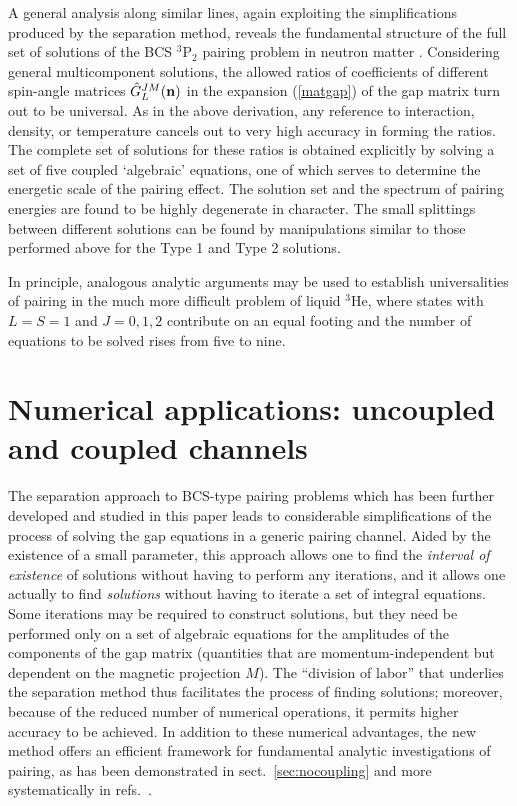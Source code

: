 A general analysis along similar lines, again exploiting
the simplifications produced by the separation method,
reveals the fundamental structure of the full set of solutions
of the BCS $^3$P$_2$ pairing problem in neutron matter \cite{univ}.
Considering general multicomponent solutions,
the allowed ratios of coefficients of different spin-angle
matrices ${\hat G}^{JM}_L({\bf  n})$ in the expansion (\ref{matgap})
of the gap matrix turn out to be universal.  As in the
above derivation, any reference to interaction, density, or
temperature cancels out to very high accuracy in forming the ratios.
The complete set of solutions for these ratios is obtained
explicitly by solving a set of five coupled `algebraic' equations,
one of which serves to determine the energetic scale of the
pairing effect.  The solution set and the spectrum of pairing
energies are found to be highly degenerate in character.  The
small splittings between different solutions can be found by
manipulations similar to those performed above for the Type 1
and Type 2 solutions.

In principle, analogous analytic arguments may be used to establish
universalities of pairing in the much more difficult problem of
liquid $^3$He, where states with $L=S=1$ and $J=0,1,2$ contribute
on an equal footing and the number of equations to be solved
rises from five to nine.

\section{Numerical applications: uncoupled and coupled channels
\label{sec:tripletnumapp}}

The separation approach to BCS-type pairing problems which has been 
further developed and studied in this paper leads to considerable 
simplifications of the process of solving the gap equations in a generic 
pairing channel.  Aided by the existence of a small parameter, 
this approach allows one to find the {\it interval of existence} of 
solutions without having to perform any iterations,
and it allows one actually to find {\it solutions} without having to 
iterate a set of integral equations.  Some iterations may be required
to construct solutions, but they need be performed only on a set of 
algebraic equations for the amplitudes of the components of the gap 
matrix (quantities that are momentum-independent but dependent on
the magnetic projection $M$).  The ``division of labor'' that underlies 
the separation method thus facilitates the process of finding solutions;
moreover, because of the reduced number of numerical operations, 
it permits higher accuracy to be achieved.  In addition to these numerical 
advantages, the new method offers an efficient framework for fundamental 
analytic investigations of pairing, as has been demonstrated in 
sect.~\ref{sec:nocoupling} and more systematically in 
refs.~\cite{kkc,univ,luso,van}.

